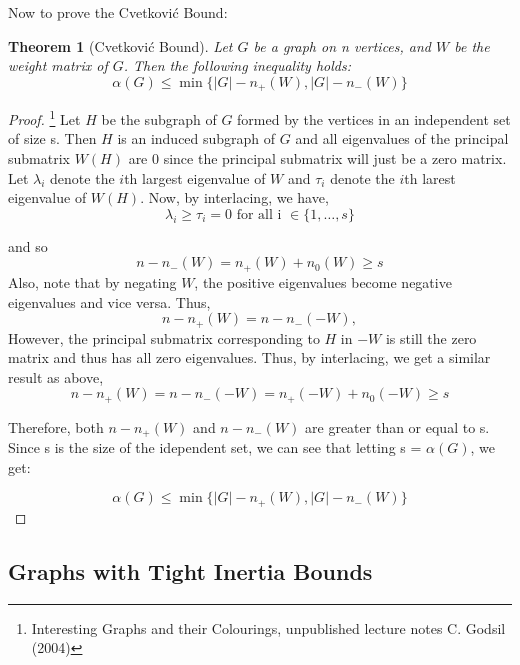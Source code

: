 \documentclass[12pt]{article}
\theoremstyle{parenbold}
\newtheorem{theorem}{Theorem}[section]
\begin{document}
Now to prove the Cvetkovi\'c Bound:

\begin{theorem}[Cvetkovi\'c Bound]
Let $G$ be a graph on n vertices, and $W$ be the weight matrix of $G$. Then the following inequality holds:
\begin{equation}
\alpha(G) \leq \min\{|G| - n_+(W),|G|-n_-(W)\}
\end{equation}
\end{theorem}

\begin{proof}\footnote{Interesting Graphs and their Colourings, unpublished lecture notes C. Godsil (2004)}
Let $H$ be the subgraph of $G$ formed by the vertices in an independent set of size s. Then $H$ is an induced subgraph of $G$ and all eigenvalues of the principal submatrix $W(H)$ are 0 since the principal submatrix will just be a zero matrix. Let $\lambda_i$ denote the $i$th largest eigenvalue of $W$ and $\tau_i$ denote the $i$th larest eigenvalue of $W(H)$. Now, by interlacing, we have,
\begin{equation}
\lambda_i \geq \tau_i = 0 \text{ for all i } \in \{1,\ldots ,s\}
\end{equation}

and so 
\begin{equation}
n - n_-(W) = n_+(W) + n_0(W) \geq s
\end{equation}
Also, note that by negating $W$, the positive eigenvalues become negative eigenvalues and vice versa. Thus,
\begin{equation}
n - n_+(W) = n - n_-(-W),
\end{equation}
However, the principal submatrix corresponding to $H$ in $-W$ is still the zero matrix and thus has all zero eigenvalues. Thus, by interlacing, we get a similar result as above, 
\begin{equation}
n - n_+(W) = n - n_-(-W) = n_+(-W) + n_0(-W) \geq s
\end{equation}

Therefore, both $n - n_+(W)$ and $n - n_-(W)$ are greater than or equal to s. Since s is the size of the idependent set, we can see that letting s = $\alpha(G)$, we get:

\begin{equation}
\alpha(G) \leq \min\{|G| - n_+(W),|G|-n_-(W)\}
\end{equation}

\end{proof}

\subsection{Graphs with Tight Inertia Bounds}
\end{document}
